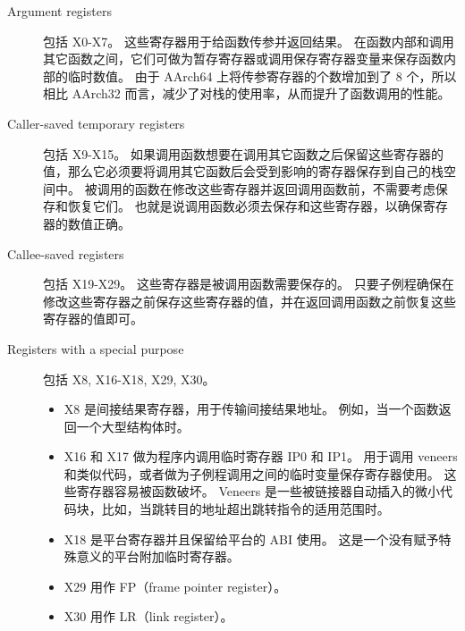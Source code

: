 \begin{description}
  \item[Argument registers] 包括 X0-X7。
    这些寄存器用于给函数传参并返回结果。
    在函数内部和调用其它函数之间，它们可做为暂存寄存器或调用保存寄存器变量来保存函数内部的临时数值。
    由于 AArch64 上将传参寄存器的个数增加到了 8 个，所以相比 AArch32 而言，减少了对栈的使用率，从而提升了函数调用的性能。
  \item[Caller-saved temporary registers] 包括 X9-X15。
    如果调用函数想要在调用其它函数之后保留这些寄存器的值，那么它必须要将调用其它函数后会受到影响的寄存器保存到自己的栈空间中。
    被调用的函数在修改这些寄存器并返回调用函数前，不需要考虑保存和恢复它们。
    也就是说调用函数必须去保存和这些寄存器，以确保寄存器的数值正确。
  \item[Callee-saved registers] 包括 X19-X29。
    这些寄存器是被调用函数需要保存的。
    只要子例程确保在修改这些寄存器之前保存这些寄存器的值，并在返回调用函数之前恢复这些寄存器的值即可。
  \item[Registers with a special purpose] 包括 X8, X16-X18, X29, X30。

    \begin{itemize}
      \item 
        X8 是间接结果寄存器，用于传输间接结果地址。
        例如，当一个函数返回一个大型结构体时。
      \item 
        X16 和 X17 做为程序内调用临时寄存器 IP0 和 IP1。
        用于调用 veneers 和类似代码，或者做为子例程调用之间的临时变量保存寄存器使用。
        这些寄存器容易被函数破坏。
        Veneers 是一些被链接器自动插入的微小代码块，比如，当跳转目的地址超出跳转指令的适用范围时。
      \item 
        X18 是平台寄存器并且保留给平台的 ABI 使用。
        这是一个没有赋予特殊意义的平台附加临时寄存器。
      \item 
        X29 用作 FP（frame pointer register）。
      \item 
        X30 用作 LR（link register）。
    \end{itemize}

\end{description}

